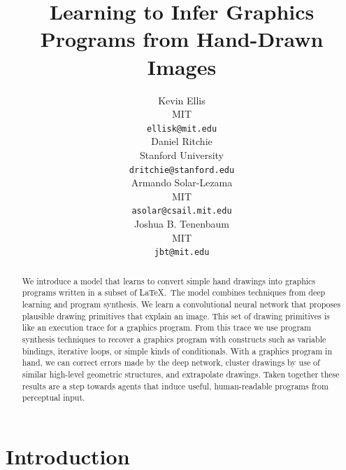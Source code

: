\documentclass{article}
\title{Learning to Infer Graphics Programs from Hand-Drawn Images}
\author{
Kevin Ellis\\
  MIT\\
  \texttt{ellisk@mit.edu} \\
  \And
  Daniel Ritchie\\
Stanford University\\
 \texttt{dritchie@stanford.edu} \\
 \And
 Armando Solar-Lezama\\
 MIT\\
\texttt{asolar@csail.mit.edu} \\
\And
Joshua B. Tenenbaum \\
MIT\\
\texttt{jbt@mit.edu}
}
\begin{document}

\maketitle

\begin{abstract}
  We introduce a model that learns to convert simple hand drawings
  into graphics programs written in a subset of \LaTeX.~The model
  combines techniques from deep learning and program synthesis.  We
  learn a convolutional neural network that proposes plausible drawing primitives
  that explain an image. This set of drawing primitives is like an execution trace for a graphics program. From this trace we use
  program synthesis techniques to recover a graphics
  program with constructs such as variable bindings, iterative loops, or
  simple kinds of conditionals. With a graphics program in hand,
  we can correct errors made by the deep network, cluster drawings by use of similar high-level geometric structures, and extrapolate drawings.
  Taken together these results are a step towards
  agents that induce useful, human-readable programs from perceptual input.  
\end{abstract}

\section{Introduction}
\end{document}
